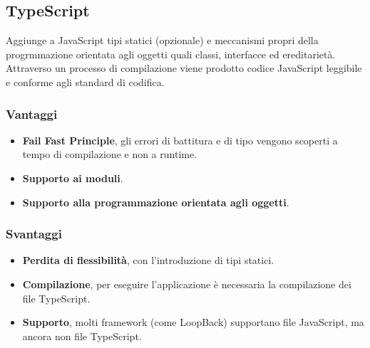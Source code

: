 \subsection{TypeScript}
Aggiunge a JavaScript tipi statici (opzionale) e meccanismi propri della progrmmazione orientata agli oggetti quali classi, interfacce ed ereditariet\`a. Attraverso un processo di compilazione viene prodotto codice JavaScript leggibile e conforme agli standard di codifica. 
\subsubsection{Vantaggi}
\begin{itemize}
\item \textbf{Fail Fast Principle}, gli errori di battitura e di tipo vengono scoperti a tempo di compilazione e non a runtime.
\item \textbf{Supporto ai moduli}.
\item \textbf{Supporto alla programmazione orientata agli oggetti}.
\end{itemize}
\subsubsection{Svantaggi}
\begin{itemize}
\item \textbf{Perdita di flessibilit\`a}, con l'introduzione di tipi statici.
\item \textbf{Compilazione}, per eseguire l'applicazione \`e necessaria la compilazione dei file TypeScript.
\item \textbf{Supporto}, molti framework (come LoopBack) supportano file JavaScript, ma ancora non file TypeScript.
\end{itemize}